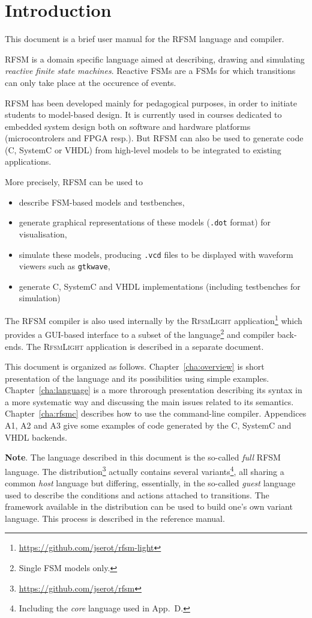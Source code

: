 \chapter{Introduction}
\label{chap:intro}

This document is a brief user manual for the RFSM language and compiler.

\medskip
RFSM is a domain specific language aimed at describing, drawing and simulating \emph{reactive finite state
  machines}. Reactive FSMs are a FSMs for which transitions can only take place at the occurence of
events.

\medskip
RFSM has been developed mainly for pedagogical purposes, in order to initiate students to
model-based design. It is currently used in courses dedicated to embedded system design both on
software and hardware platforms (microcontrolers and FPGA resp.). But RFSM can also be used to
generate code (C, SystemC or VHDL) from high-level models to be integrated to existing applications.

More precisely, RFSM can be used to
\begin{itemize}
\item describe FSM-based models and testbenches,
\item generate graphical representations of these models (\verb|.dot| format) for visualisation,
\item simulate these models, producing \verb|.vcd| files to be displayed with waveform viewers such
  as \texttt{gtkwave},
\item generate C, SystemC and VHDL implementations (including testbenches for simulation)
\end{itemize}

\medskip
The RFSM compiler is also used internally by the \textsc{RfsmLight}
application\footnote{\url{https://github.com/jserot/rfsm-light}} which provides a GUI-based interface to a
subset of the language\footnote{Single FSM models only.} and compiler back-ends. The
\textsc{RfsmLight} application is described in a separate document.

\medskip
This document is organized as follows.
Chapter~\ref{cha:overview} is short presentation of the language and its possibilities using simple
examples. Chapter~\ref{cha:language} is a more throrough presentation describing its syntax in a more
systematic way and discussing the main issues related to its semantics.
Chapter~\ref{cha:rfsmc} describes how to use the command-line compiler. Appendices
A1, A2 and A3 give some examples of code generated by the C, SystemC and VHDL backends.

\medskip
\textbf{Note}. The language described in this document is the so-called \emph{full} RFSM language. The
distribution\footnote{\url{https://github.com/jserot/rfsm}} actually contains several
variants\footnote{Including the \emph{core} language used in App.~D.}, all
sharing a common \emph{host} language but differing, essentially, in the so-called \emph{guest} language used to describe
the conditions and actions attached to transitions. The framework available in the distribution
can be used to build one's own variant language. This process is described in the reference manual. 

